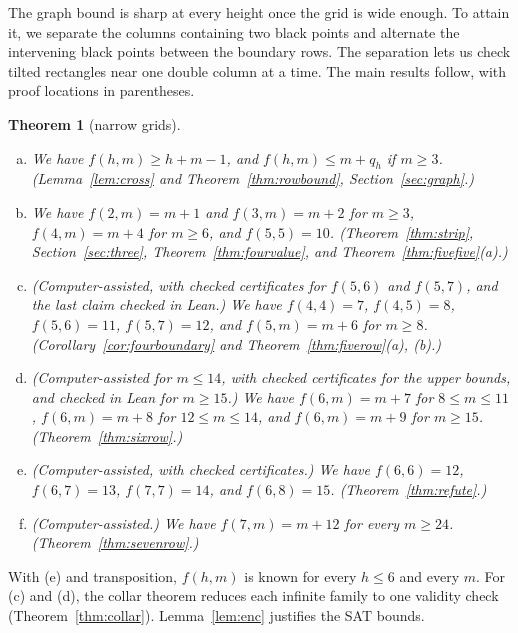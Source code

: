 \documentclass[12pt]{article}
\theoremstyle{plain}
\newtheorem{introthm}{Theorem}
\theoremstyle{definition}
\theoremstyle{remark}
\begin{document}
The graph bound is sharp at every height once the grid is wide enough.
To attain it, we separate the columns containing two black points and alternate
the intervening black points between the boundary rows. The separation lets us
check tilted rectangles near one double column at a time. The main results
follow, with proof locations in parentheses.

\begin{introthm}[narrow grids]\label{thm:A}
\leavevmode
\begin{enumerate}[(a)]
\item We have $f(h,m)\ge h+m-1$, and $f(h,m)\le m+q_h$ if $m\ge3$. \textup{(Lemma~\ref{lem:cross}
and Theorem~\ref{thm:rowbound}, Section~\ref{sec:graph}.)}
\item We have $f(2,m)=m+1$ and $f(3,m)=m+2$ for $m\ge3$, $f(4,m)=m+4$ for $m\ge6$,
and $f(5,5)=10$. \textup{(Theorem~\ref{thm:strip}, Section~\ref{sec:three},
Theorem~\ref{thm:fourvalue}, and Theorem~\ref{thm:fivefive}(a).)}
\item (Computer-assisted, with checked certificates for $f(5,6)$ and $f(5,7)$, and the last
claim checked in Lean.) We have $f(4,4)=7$, $f(4,5)=8$,
$f(5,6)=11$, $f(5,7)=12$, and $f(5,m)=m+6$ for $m\ge8$. \textup{(Corollary~\ref{cor:fourboundary}
and Theorem~\ref{thm:fiverow}(a), (b).)}
\item (Computer-assisted for $m\le14$, with checked certificates for the upper bounds, and
checked in Lean for $m\ge15$.) We have $f(6,m)=m+7$ for $8\le m\le11$, $f(6,m)=m+8$ for
$12\le m\le14$, and $f(6,m)=m+9$ for $m\ge15$. \textup{(Theorem~\ref{thm:sixrow}.)}
\item (Computer-assisted, with checked certificates.) We have $f(6,6)=12$,
$f(6,7)=13$, $f(7,7)=14$, and $f(6,8)=15$. \textup{(Theorem~\ref{thm:refute}.)}
\item (Computer-assisted.) We have $f(7,m)=m+12$ for every $m\ge24$.
\textup{(Theorem~\ref{thm:sevenrow}.)}
\end{enumerate}
\end{introthm}

With (e) and transposition, $f(h,m)$ is known for every $h\le6$ and every $m$.
For (c) and (d), the collar theorem reduces each infinite family to
one validity check (Theorem~\ref{thm:collar}). Lemma~\ref{lem:enc}
justifies the SAT bounds.
\end{document}
